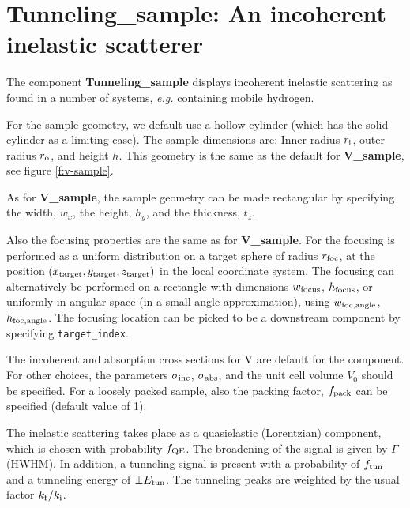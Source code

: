 \section{Tunneling\_sample: An incoherent inelastic scatterer}
\label{s:Tunneling_sample}



The component {\bf Tunneling\_sample}
displays incoherent inelastic scattering as found in a number of systems, {\em e.g.}
containing mobile hydrogen. 

For the sample geometry, we default use a
hollow cylinder (which has the solid cylinder as a limiting case).
The sample dimensions are: Inner radius $r_{\rm i}$,
outer radius $r_{\rm o}$, and height $h$. This geometry is the same as 
the default for {\bf V\_sample}, see figure \ref{f:v-sample}.

As for {\bf V\_sample}, the sample geometry can be made rectangular 
by specifying the width, $w_x$, the height, $h_y$, and the thickness, $t_z$.

Also the focusing properties are the same as for {\bf V\_sample}.
For the focusing is performed as a uniform distribution on
a target sphere of radius $r_{\rm foc}$, at the position
$(x_{\rm target},y_{\rm target},z_{\rm target})$
in the local coordinate system.
The focusing can alternatively be performed on a rectangle with dimensions
$w_{\rm focus}$, $h_{\rm focus}$, or uniformly in angular space
(in a small-angle approximation),
using $w_{\rm foc, angle}$, $h_{\rm foc, angle}$.
The focusing location can be picked to be a downstream component by
specifying \verb+target_index+.

The incoherent and absorption cross sections for V are default
for the component. For other choices, the
parameters $\sigma_{\rm inc}$, $\sigma_{\rm abs}$,
and the unit cell volume $V_0$ should be specified.
For a loosely packed sample, also the packing factor, $f_{\rm pack}$
can be specified (default value of 1).

The inelastic scattering takes place as a quasielastic (Lorentzian)
component, which is chosen with probability $f_{\rm QE}$.
The broadening of the signal is given by $\Gamma$ (HWHM).
In addition, a tunneling signal is present with a probability of $f_{\rm tun}$ 
and a tunneling energy of $\pm E_{\rm tun}$. 
The tunneling peaks are weighted by the usual factor $k_{\rm f}/k_{\rm i}$.

